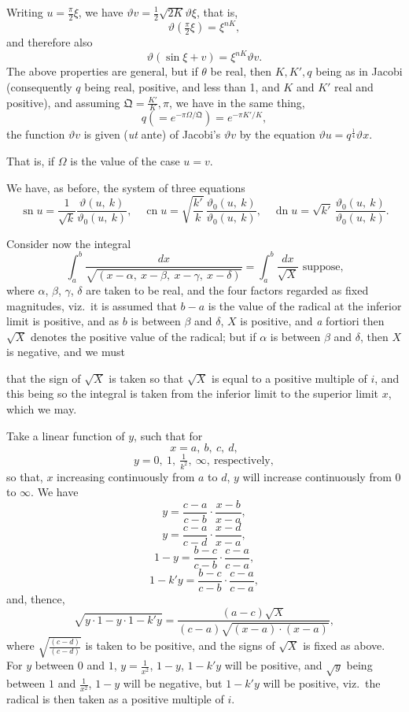 \documentclass[11pt,a4paper]{book}
\begin{document}
Writing $u=\frac{\pi}{2}\xi$, we have $\vartheta v=\frac{1}{2}\sqrt{2K}\vartheta\xi$, that is,
\[
\vartheta\left(\tfrac{\pi}{2}\xi\right)=\xi^{nK},
\]
and therefore also
\[
\vartheta(\sin\xi+v)=\xi^{nK}\vartheta v.
\]
The above properties are general, but if $\theta$ be real, then $K, K', q$ being as in Jacobi (consequently $q$ being real, positive, and less than 1, and $K$ and $K'$ real and positive), and assuming $\mathfrak{Q}=\frac{K'}{K},\pi$, we have in the same thing,
\[
q(=e^{-\pi\Omega/\mathfrak{Q}})=e^{-\pi K'/K},
\]
the function $\vartheta v$ is given (\textit{ut} ante) of Jacobi's $\vartheta v$ by the equation $\vartheta u=q^{\frac{1}{4}}\vartheta x$.

That is, if $\Omega$ is the value of the case $u=v$.

We have, as before, the system of three equations
\[
\operatorname{sn} u=\frac{1}{\sqrt{k}}\frac{\vartheta(u,\ k)}{\vartheta_0(u,\ k)},\quad \operatorname{cn} u=\sqrt{\frac{k'}{k}}\,\frac{\vartheta_0(u,\ k)}{\vartheta_0(u,\ k)},\quad \operatorname{dn} u=\sqrt{k'}\,\frac{\vartheta_0(u,\ k)}{\vartheta_0(u,\ k)}.
\]

Consider now the integral
\[
\int_a^b\frac{dx}{\sqrt{(x-\alpha,\ x-\beta,\ x-\gamma,\ x-\delta)}}=\int_a^b\frac{dx}{\sqrt{X}}\text{ suppose,}
\]
where $\alpha$, $\beta$, $\gamma$, $\delta$ are taken to be real, and the four factors regarded as fixed magnitudes, viz.\ it is assumed that $b-a$ is the value of the radical at the inferior limit is positive, and as $b$ is between $\beta$ and $\delta$, $X$ is positive, and \textit{a} fortiori then $\sqrt{X}$ denotes the positive value of the radical; but if $\alpha$ is between $\beta$ and $\delta$, then $X$ is negative, and we must

\newpage
that the sign of $\sqrt{X}$ is taken so that $\sqrt{X}$ is equal to a positive multiple of $i$, and this being so the integral is taken from the inferior limit to the superior limit $x$, which we may.

Take a linear function of $y$, such that for
\[
x=a,\ b,\ c,\ d,
\]
\[
y=0,\ 1,\ \tfrac{1}{k^2},\ \infty,\ \text{respectively},
\]
so that, $x$ increasing continuously from $a$ to $d$, $y$ will increase continuously from $0$ to $\infty$. We have
\[
y=\frac{c-a}{c-b}\cdot\frac{x-b}{x-a},
\]
\[
y=\frac{c-a}{c-d}\cdot\frac{x-d}{x-a},
\]
\[
1-y=\frac{b-c}{c-b}\cdot\frac{c-a}{c-a},
\]
\[
1-k'y=\frac{b-c}{c-b}\cdot\frac{c-a}{c-a},
\]
and, thence,
\[
\sqrt{y\cdot 1-y\cdot 1-k'y}=\frac{(a-c)\sqrt{X}}{(c-a)\sqrt{(x-a)\cdot(x-a)}},
\]
where $\sqrt{\frac{(c-d)}{(c-d)}}$ is taken to be positive, and the signs of $\sqrt{X}$ is fixed as above. For $y$ between $0$ and $1$, $y=\frac{1}{x^2}$, $1-y$, $1-k'y$ will be positive, and $\sqrt{y}$ being between $1$ and $\frac{1}{x^2}$, $1-y$ will be negative, but $1-k'y$ will be positive, viz.\ the radical is then taken as a positive multiple of $i$.
\end{document}
